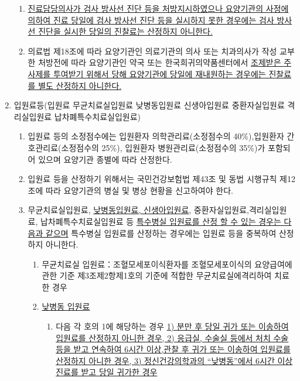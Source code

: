 \begin{enumerate}[1.]
\begin{enumerate}[가.]
	\item \uline{진료담당의사가 검사\cntrdot{} 방사선 진단 등을 처방지시하였으나 요양기관의 사정에 의하여 진료 당일에 검사\cntrdot{} 방사선 진단 등을 실시하지 못한 경우에는 검사\cntrdot{} 방사선 진단을 실시한 당일의 진찰료는 산정하지 아니한다.}
	\item 의료법 제18조에 따라 요양기관인 의료기관의 의사 또는 치과의사가 작성\cntrdot{} 교부한 처방전에 따라 요양기관인 약국 또는 한국희귀의약품센터에서 \uline{조제받은 주사제를 투여받기 위해서 당해 요양기관에 당일에 재내원하는 경우에는 진찰료를 별도 산정하지 아니한다.}
	\end{enumerate}
\item 입원료등(입원료\cntrdot{} 무균치료실입원료\cntrdot{} 낮병동입원료\cntrdot{} 신생아입원료\cntrdot{} 중환자실입원료\cntrdot{} 격리실입원료\cntrdot{} 납차폐특수치료실입원료)
	\begin{enumerate}[가.]
	\item 입원료 등의 소정점수에는 입원환자 의학관리료(소정점수의 40\%),입원환자 간호관리료(소정점수의 25\%), 입원환자 병원관리료(소정점수의 35\%)가 포함되어 있으며 요양기관 종별에 따라 산정한다.
	\item 입원료 등을 산정하기 위해서는 국민건강보험법 제43조 및 동법 시행규칙 제12조에 따라 요양기관의 병실 및 병상 현황을 신고하여야 한다.
	\item 무균치료실입원료, \uline{낮병동입원료, 신생아입원료}, 중환자실입원료,격리실입원료, 납차폐특수치료실입원료 등 \uline{특수병실 입원료를 산정 할 수 있는 경우는 다음과 같으며} 특수병실 입원료를 산정하는 경우에는 입원료 등을 중복하여 산정하지 아니한다.
		\begin{enumerate}[(1)]\tightlist
		\item 무균치료실 입원료：조혈모세포이식환자를 조혈모세포이식의 요양급여에 관한 기준 제3조제2항제1호의 기준에 적합한 무균치료실에격리하여 치료한 경우
		\item \uline{낮병동 입원료}
			\begin{enumerate}[(가)]\tightlist
			\item 다음 각 호의 1에 해당하는 경우 \uline{1) 분만 후 당일 귀가 또는 이송하여 입원료를 산정하지 아니한 경우, 2) 응급실, 수술실 등에서 처치\cntrdot{} 수술 등을 받고 연속하여 6시간 이상,관찰 후 귀가 또는 이송하여 입원료를 산정하지 아니한 경우, 3) 정신건강의학과의 “낮병동”에서 6시간 이상 진료를 받고 당일 귀가한 경우}
			

\end{enumerate}
\end{enumerate}
\end{enumerate}
\end{enumerate}
